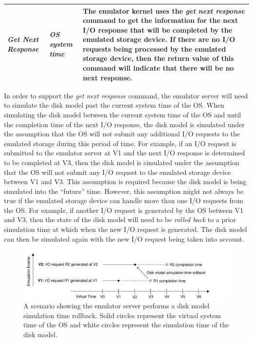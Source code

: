 \begin{table}[htbp]
\begin{tabulary}{\dimexpr\textwidth-3.5cm}{|p{3.5cm}|L|J|}
		\textit{Get Next Response} &
		\textit{OS system time} &
		The emulator kernel uses the \textit{get next response} command to get the information for the next I/O response that will be completed by the emulated storage device. If there are no I/O requests being processed by the emulated storage device, then the return value of this command will indicate that there will be no next response. \\ \hline
	\end{tabulary}
\end{table}%


In order to support the \textit{get next response} command, the emulator server will need to simulate the disk model past the current system time of the OS. When simulating the disk model between the current system time of the OS and until the completion time of the next I/O response, the disk model is simulated under the assumption that the OS will not submit any additional I/O requests to the emulated storage during this period of time. For example, if an I/O request is submitted to the emulator server at V1 and the next I/O response is determined to be completed at V3, then the disk model is simulated under the assumption that the OS will not submit any I/O request to the emulated storage device between V1 and V3. This assumption is required because the disk model is being simulated into the ``future'' time. However, this assumption might not always be true if the emulated storage device can handle more than one I/O requests from the OS. For example, if another I/O request is generated by the OS between V1 and V3, then the state of the disk model will need to be \textit{rolled back} to a prior simulation time at which when the new I/O request is generated. The disk model can then be simulated again with the new I/O request being taken into account.

\begin{figure}[htpb]
	\centering
	\includegraphics[width=\textwidth]{figures/ch6-fig-7.pdf}
	\caption[Disk model simulation time rollback.]{\label{fig:ch6-fig-7}A scenario showing the emulator server performs a disk model simulation time rollback. Solid circles represent the virtual system time of the OS and white circles represent the simulation time of the disk model.}
\end{figure}

